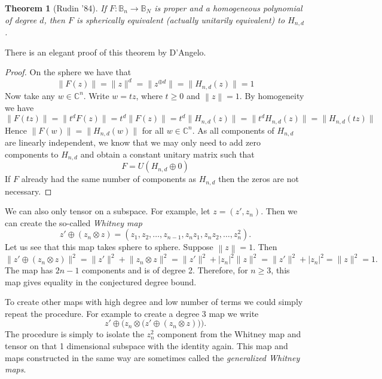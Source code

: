 \documentclass[12pt,openany]{book}
\newcommand{\abs}[1]{\left\lvert {#1} \right\rvert}
\newcommand{\norm}[1]{\left\lVert {#1} \right\rVert}
\newcommand{\smnorm}[1]{\lVert {#1} \rVert}
\newcommand{\C}{{\mathbb{C}}}
\newcommand{\bB}{{\mathbb{B}}}
\newcommand{\myindex}[1]{#1\index{#1}}
\theoremstyle{plain}
\newtheorem{thm}{Theorem}[section]
\theoremstyle{remark}
\theoremstyle{definition}
\theoremstyle{exercise}
\theoremstyle{example}
\begin{document}
\begin{thm}[Rudin '84]
If $F \colon \bB_n \to \bB_N$ is
proper and a homogeneous polynomial of degree $d$, then $F$ is spherically
equivalent (actually unitarily equivalent) to $H_{n,d}$.
\end{thm}


There is an elegant proof of this theorem by D'Angelo.

\begin{proof}
On the sphere we have that
\begin{equation}
\smnorm{F(z)} = \smnorm{z}^d = \smnorm{z^{\oplus d}} = \smnorm{H_{n,d}(z)} = 1
\end{equation}
Now take any $w \in \C^n$.  Write $w = t z$, where $t \geq 0$ and
$\norm{z} = 1$.  By homogeneity we have
\begin{equation}
\smnorm{F(tz)} =
\smnorm{t^d F(z)} =
t^d \smnorm{F(z)}
= t^d \smnorm{H_{n,d}(z)}
= \smnorm{t^d H_{n,d}(z)}
= \smnorm{H_{n,d}(tz)}
\end{equation}
Hence $\smnorm{F(w)} = \smnorm{H_{n,d}(w)}$ for all $w \in \C^n$.  As all
components of $H_{n,d}$ are linearly independent, we know that we may only
need to add zero components to $H_{n,d}$ and obtain a constant unitary matrix such that
\begin{equation}
F = U ( H_{n,d} \oplus 0 )
\end{equation}
If $F$ already had the same number of components as $H_{n,d}$ then the zeros
are not necessary.
\end{proof}

We can also only tensor on a subspace.  For example, let $z = (z',z_n)$.
Then we can create the so-called \emph{\myindex{Whitney map}}
\begin{equation}
z' \oplus ( z_n \otimes z ) = (z_1,z_2,\ldots,z_{n-1}, z_n z_1, z_n z_2
,\ldots, z_n^2 ) .
\end{equation}
Let us see that this map takes sphere to sphere.  Suppose $\norm{z} = 1$.
Then
\begin{equation}
\smnorm{z' \oplus ( z_n \otimes z ) }^2
=
\smnorm{z'}^2 +  \smnorm{ z_n \otimes z }^2
=
\smnorm{z'}^2 +  \abs{z_n}^2 \smnorm{ z }^2
=
\smnorm{z'}^2 +  \abs{z_n}^2
=
\smnorm{z}^2 = 1 .
\end{equation}
The map has $2n-1$ components and is of degree 2.  Therefore, for $n \geq
3$, this map gives equality in the conjectured degree bound.

To create other maps with high degree and low number of terms we could simply
repeat the procedure.  For example to create a degree 3 map we write
\begin{equation}
z' \oplus \bigl( z_n \otimes \bigl(z' \oplus ( z_n \otimes z ) \bigr) \bigr) .
\end{equation}
The procedure is simply to isolate the $z_n^2$ component from the Whitney map
and tensor on that 1 dimensional subspace with the identity again.  This map
and maps constructed in the same way are sometimes called the
\emph{\myindex{generalized Whitney maps}}.
\end{document}
